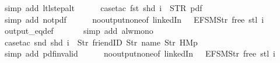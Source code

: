 \begin{isabellebody}
\ {\isacharparenleft}simp\ add{\isacharcolon}\ ltl{\isacharunderscore}step{\isacharunderscore}alt{\isacharparenright}\isanewline
\ \ \ \ \isamarkupfalse%
\ {\isacharparenleft}case{\isacharunderscore}tac\ {\isachardoublequoteopen}{\isacharparenleft}fst\ {\isacharparenleft}shd\ i{\isacharparenright}{\isacharparenright}\ {\isacharequal}\ STR\ {\isacharprime}{\isacharprime}pdf{\isacharprime}{\isacharprime}{\isachardoublequoteclose}{\isacharparenright}\isanewline
\ \ \ \ \ \isamarkupfalse%
\isanewline
\ \ \ \ \ \isamarkupfalse%
\ {\isacharparenleft}simp\ add{\isacharcolon}\ not{\isacharunderscore}pdf{\isacharunderscore}{}{\isacharparenright}\isanewline
\ \ \ \ \isamarkupfalse%
\ no{\isacharunderscore}output{\isacharunderscore}none{\isacharbrackleft}of\ linkedIn\ {\isachardoublequoteopen}{\isacharparenleft}{\isacharless}{\isachargreater}{\isacharparenleft}{}\ {\isacharcolon}{\isacharequal}\ EFSM{\isachardot}Str\ {\isacharprime}{\isacharprime}free{\isacharprime}{\isacharprime}{\isacharparenright}{\isacharparenright}{\isachardoublequoteclose}\ {\isachardoublequoteopen}{\isacharparenleft}stl\ i{\isacharparenright}{\isachardoublequoteclose}{\isacharbrackright}\isanewline
\ \ \ \ \isamarkupfalse%
\ output_eq{\isacharunderscore}def\isanewline
\ \ \ \ \ \isamarkupfalse%
\ {\isacharparenleft}simp\ add{\isacharcolon}\ alw{\isacharunderscore}mono{\isacharparenright}\isanewline
\ \ \ \ \isamarkupfalse%
\ {\isacharparenleft}case{\isacharunderscore}tac\ {\isachardoublequoteopen}{\isacharparenleft}snd\ {\isacharparenleft}shd\ i{\isacharparenright}{\isacharparenright}\ {\isacharequal}\ {\isacharbrackleft}Str\ {\isacharprime}{\isacharprime}friendID{\isacharprime}{\isacharprime}{\isacharcomma}\ Str\ {\isacharprime}{\isacharprime}name{\isacharprime}{\isacharprime}{\isacharcomma}\ Str\ {\isacharprime}{\isacharprime}HM{}p{\isacharprime}{\isacharprime}{\isacharbrackright}{\isachardoublequoteclose}{\isacharparenright}\isanewline
\ \ \ \ \ \isamarkupfalse%
\isanewline
\ \ \ \ \ \isamarkupfalse%
\ {\isacharparenleft}simp\ add{\isacharcolon}\ pdf{\isacharunderscore}{}{\isacharunderscore}invalid{\isacharparenright}\isanewline
\ \ \ \ \isamarkupfalse%
\ no{\isacharunderscore}output{\isacharunderscore}none{\isacharbrackleft}of\ linkedIn\ {\isachardoublequoteopen}{\isacharparenleft}{\isacharless}{\isachargreater}{\isacharparenleft}{}\ {\isacharcolon}{\isacharequal}\ EFSM{\isachardot}Str\ {\isacharprime}{\isacharprime}free{\isacharprime}{\isacharprime}{\isacharparenright}{\isacharparenright}{\isachardoublequoteclose}\ {\isachardoublequoteopen}{\isacharparenleft}stl\ i{\isacharparenright}{\isachardoublequoteclose}{\isacharbrackright}\isanewline

\end{isabellebody}
